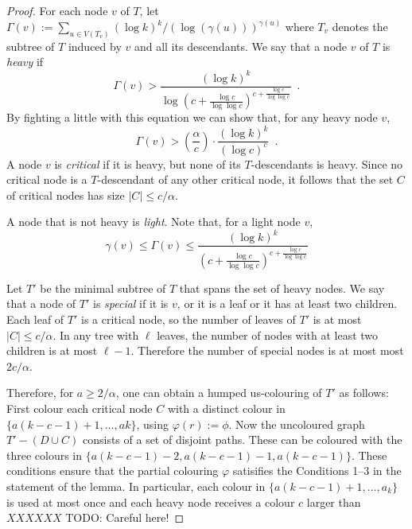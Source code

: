 \documentclass[kpfonts]{patmorin}
\begin{document}
\begin{proof}

    For each node $v$ of $T$, let $\Gamma(v):=\sum_{u\in V(T_v)}(\log k)^k/(\log(\gamma(u)))^{\gamma(u)}$ where $T_v$ denotes the subtree of $T$ induced by $v$ and all its descendants.  We say that a node $v$ of $T$ is \emph{heavy} if
    \[
        \Gamma(v)> \frac{(\log k)^k}{\log\left(c+\frac{\log c}{\log\log c}\right)^{c+\frac{\log c}{\log\log c}}} \enspace .
    \]
    By fighting a little with this equation we can show that, for any heavy node $v$,
    \[
        \Gamma(v) > \left(\frac{\alpha}{c}\right)\cdot
            \frac{(\log k)^k}{(\log c)^c} \enspace .
    \]
    A node $v$ is \emph{critical} if it is heavy, but none of its $T$-descendants is heavy.  Since no critical node is a $T$-descendant of any other critical node, it follows that the set $C$ of critical nodes has size $|C|\le c/\alpha$.

    A node that is not heavy is \emph{light}.  Note that, for a light node $v$,
    \[
        \gamma(v)\le \Gamma(v) \le \frac{(\log k)^k}{\left(c+\frac{\log c}{\log\log c}\right)^{c+\frac{\log c}{\log\log c}}}
    \]

    Let $T'$ be the minimal subtree of $T$ that spans the set of heavy nodes. We say that a node of $T'$ is \emph{special} if it is $v$, or it is a leaf or it has at least two children.  Each leaf of $T'$ is a critical node, so the number of leaves of $T'$ is at most $|C|\le c/\alpha$.  In any tree with $\ell$ leaves, the number of nodes with at least two children is at most $\ell-1$.  Therefore the number of special nodes is at most most $2c/\alpha$.

    Therefore, for $a\ge 2/\alpha$, one can obtain a humped us-colouring of $T'$ as follows:  First colour each critical node $C$ with a distinct colour in $\{a(k-c-1)+1,\ldots,ak\}$, using $\varphi(r):=\phi$.  Now the uncoloured graph $T'-(D\cup C)$ consists of a set of disjoint paths.  These can be coloured with the three colours in $\{a(k-c-1)-2,a(k-c-1)-1,a(k-c-1)\}$.  These conditions ensure that the partial colouring $\varphi$ satisifies the Conditions 1--3 in the statement of the lemma.  In particular, each colour in $\{a(k-c-1)+1,\ldots,a_k\}$ is used at most once and each heavy node receives a colour $c$ larger than $XXXXXX$ TODO: Careful here!


\end{proof}
\end{document}
